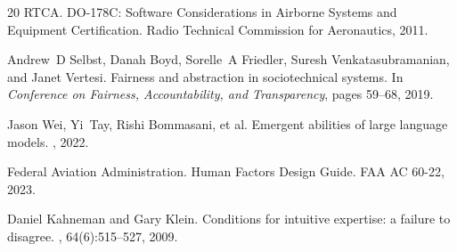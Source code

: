 \documentclass[sigconf,nonacm]{acmart}
\begin{document}
\begin{thebibliography}{20}
RTCA.
\newblock DO-178C: Software Considerations in Airborne Systems and Equipment Certification.
\newblock Radio Technical Commission for Aeronautics, 2011.

Andrew~D Selbst, Danah Boyd, Sorelle~A Friedler, Suresh Venkatasubramanian, and Janet Vertesi.
\newblock Fairness and abstraction in sociotechnical systems.
\newblock In {\em Conference on Fairness, Accountability, and Transparency}, pages 59--68, 2019.

Jason Wei, Yi~Tay, Rishi Bommasani, et al.
\newblock Emergent abilities of large language models.
, 2022.


Federal Aviation Administration.
\newblock Human Factors Design Guide.
\newblock FAA AC 60-22, 2023.

Daniel Kahneman and Gary Klein.
\newblock Conditions for intuitive expertise: a failure to disagree.
, 64(6):515--527, 2009.

\end{thebibliography}
\end{document}
